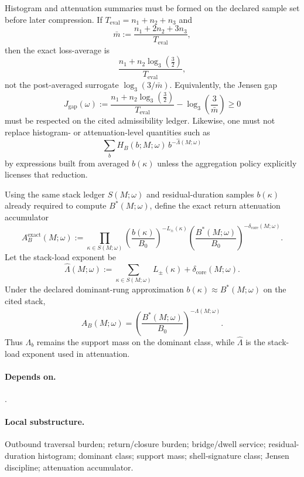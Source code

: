 \begin{definition}
\label{def:jensen-discipline}
Histogram and attenuation summaries must be formed on the declared sample set before later compression. If $T_{\mathrm{eval}}=n_1+n_2+n_3$ and
\[
\bar m:=\frac{n_1+2n_2+3n_3}{T_{\mathrm{eval}}},
\]
then the exact loss-average is
\[
\frac{n_1+n_2\log_3\!\left(\frac{3}{2}\right)}{T_{\mathrm{eval}}},
\]
not the post-averaged surrogate $\log_3(3/\bar m)$. Equivalently, the Jensen gap
\[
J_{\mathrm{gap}}(\omega):=
\frac{n_1+n_2\log_3\!\left(\frac{3}{2}\right)}{T_{\mathrm{eval}}}
-
\log_3\!\left(\frac{3}{\bar m}\right)\ge 0
\]
must be respected on the cited admissibility ledger. Likewise, one must not replace histogram- or attenuation-level quantities such as
\[
\sum_b H_B(b;M;\omega)\,b^{-\widehat\Lambda(M;\omega)}
\]
by expressions built from averaged $b(\kappa)$ unless the aggregation policy explicitly licenses that reduction.
\end{definition}

\begin{definition}
\label{def:attenuation-operator}
Using the same stack ledger $S(M;\omega)$ and residual-duration samples $b(\kappa)$ already required to compute $B^*(M;\omega)$, define the exact return attenuation accumulator
\[
A_B^{\mathrm{exact}}(M;\omega):=
\prod_{\kappa\in S(M;\omega)}\left(\frac{b(\kappa)}{B_0}\right)^{-L_{\pm}(\kappa)}\left(\frac{B^*(M;\omega)}{B_0}\right)^{-\delta_{\mathrm{core}}(M;\omega)}.
\]
Let the stack-load exponent be
\[
\widehat\Lambda(M;\omega):=\sum_{\kappa\in S(M;\omega)}L_{\pm}(\kappa)+\delta_{\mathrm{core}}(M;\omega).
\]
Under the declared dominant-rung approximation $b(\kappa)\approx B^*(M;\omega)$ on the cited stack,
\[
A_B(M;\omega)=\left(\frac{B^*(M;\omega)}{B_0}\right)^{-\widehat\Lambda(M;\omega)}.
\]
Thus $\Lambda_b$ remains the support mass on the dominant class, while $\widehat\Lambda$ is the stack-load exponent used in attenuation.
\end{definition}

\paragraph{Depends on.} .
\paragraph{Local substructure.} Outbound traversal burden; return/closure burden; bridge/dwell service; residual-duration histogram; dominant class; support mass; shell-signature class; Jensen discipline; attenuation accumulator.
